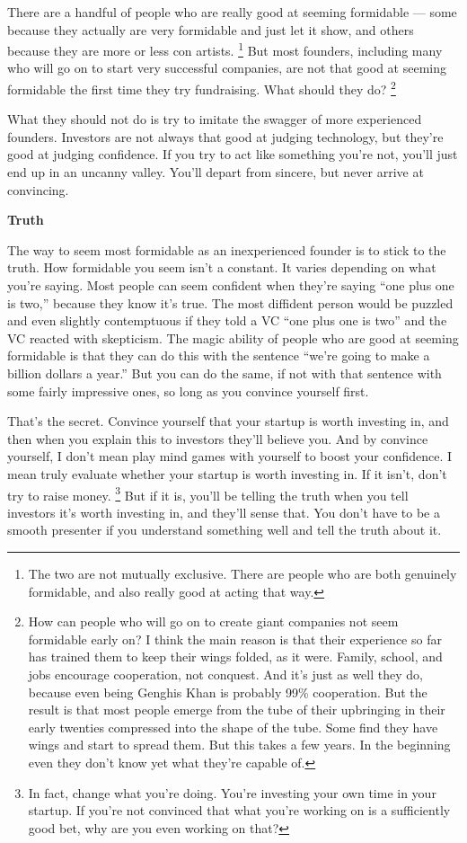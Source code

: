 There are a handful of people who are really good at seeming formidable
--- some because they actually are very formidable and just let it show,
and others because they are more or less con artists.
\footnote{The two are not mutually exclusive. There are people who are
both genuinely formidable, and also really good at acting that way.} But most founders, including many who will go on
to start very successful companies, are not that good at seeming
formidable the first time they try fundraising. What should they do?
\footnote{How can people who will go on to create giant companies not seem
formidable early on? I think the main reason is that their experience so
far has trained them to keep their wings folded, as it were. Family,
school, and jobs encourage cooperation, not conquest. And it's just as
well they do, because even being Genghis Khan is probably 99\%
cooperation. But the result is that most people emerge from the tube of
their upbringing in their early twenties compressed into the shape of
the tube. Some find they have wings and start to spread them. But this
takes a few years. In the beginning even they don't know yet what
they're capable of.}

What they should not do is try to imitate the swagger of more
experienced founders. Investors are not always that good at judging
technology, but they're good at judging confidence. If you try to act
like something you're not, you'll just end up in an uncanny valley.
You'll depart from sincere, but never arrive at convincing.

\textbf{Truth}

The way to seem most formidable as an inexperienced founder is to stick
to the truth. How formidable you seem isn't a constant. It varies
depending on what you're saying. Most people can seem confident when
they're saying ``one plus one is two,'' because they know it's true. The
most diffident person would be puzzled and even slightly contemptuous if
they told a VC ``one plus one is two'' and the VC reacted with
skepticism. The magic ability of people who are good at seeming
formidable is that they can do this with the sentence ``we're going to
make a billion dollars a year.'' But you can do the same, if not with
that sentence with some fairly impressive ones, so long as you convince
yourself first.

That's the secret. Convince yourself that your startup is worth
investing in, and then when you explain this to investors they'll
believe you. And by convince yourself, I don't mean play mind games with
yourself to boost your confidence. I mean truly evaluate whether your
startup is worth investing in. If it isn't, don't try to raise money.
\footnote{In fact, change what you're doing. You're investing your own
time in your startup. If you're not convinced that what you're working
on is a sufficiently good bet, why are you even working on that?} But if it is, you'll be telling the truth when
you tell investors it's worth investing in, and they'll sense that. You
don't have to be a smooth presenter if you understand something well and
tell the truth about it.

